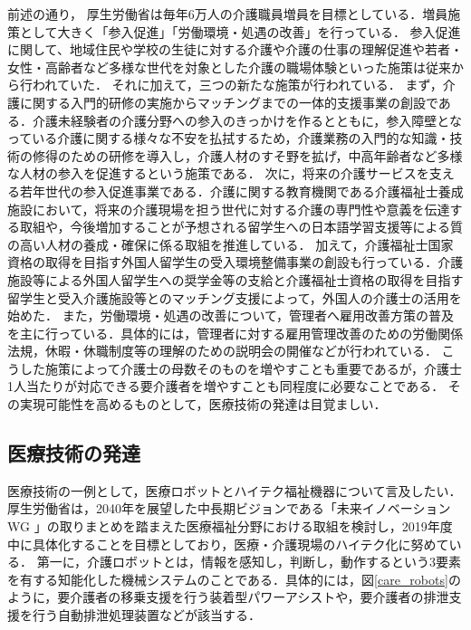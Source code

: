 前述の通り， 厚生労働省は毎年6万人の介護職員増員を目標としている．増員施策として大きく「参入促進」「労働環境・処遇の改善」を行っている\cite{nurse_solution}．
参入促進に関して、地域住民や学校の生徒に対する介護や介護の仕事の理解促進や若者・女性・高齢者など多様な世代を対象とした介護の職場体験といった施策は従来から行われていた．
それに加えて，三つの新たな施策が行われている．
まず，介護に関する入門的研修の実施からマッチングまでの一体的支援事業の創設である．介護未経験者の介護分野への参入のきっかけを作るとともに，参入障壁となっている介護に関する様々な不安を払拭するため，介護業務の入門的な知識・技術の修得のための研修を導入し，介護人材のすそ野を拡げ，中高年齢者など多様な人材の参入を促進するという施策である．
次に，将来の介護サービスを支える若年世代の参入促進事業である．介護に関する教育機関である介護福祉士養成施設において，将来の介護現場を担う世代に対する介護の専門性や意義を伝達する取組や，今後増加することが予想される留学生への日本語学習支援等による質の高い人材の養成・確保に係る取組を推進している．
加えて，介護福祉士国家資格の取得を目指す外国人留学生の受入環境整備事業の創設も行っている．介護施設等による外国人留学生への奨学金等の支給と介護福祉士資格の取得を目指す留学生と受入介護施設等とのマッチング支援によって，外国人の介護士の活用を始めた．
また，労働環境・処遇の改善について，管理者へ雇用改善方策の普及を主に行っている．具体的には，管理者に対する雇用管理改善のための労働関係法規，休暇・休職制度等の理解のための説明会の開催などが行われている．
こうした施策によって介護士の母数そのものを増やすことも重要であるが，介護士1人当たりが対応できる要介護者を増やすことも同程度に必要なことである．
その実現可能性を高めるものとして，医療技術の発達は目覚ましい．

\subsection{医療技術の発達}

医療技術の一例として，医療ロボットとハイテク福祉機器について言及したい． 厚生労働省は，2040年を展望した中長期ビジョンである「未来イノベーション WG 」の取りまとめを踏まえた医療福祉分野における取組を検討し，2019年度中に具体化することを目標としており，医療・介護現場のハイテク化に努めている．\cite{care_robots}
第一に，介護ロボットとは，情報を感知し，判断し，動作するという3要素を有する知能化した機械システムのことである．具体的には，図\ref{care_robots}のように，要介護者の移乗支援を行う装着型パワーアシストや，要介護者の排泄支援を行う自動排泄処理装置などが該当する．


